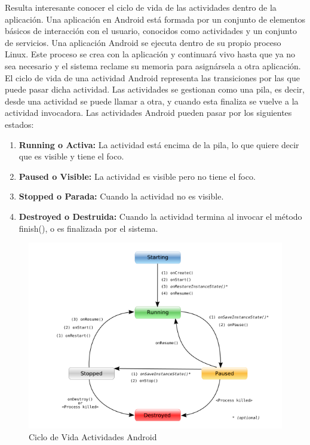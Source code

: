 \documentclass[a4paper,11pt]{book}
\begin{document}
Resulta interesante conocer el ciclo de vida\cite{col} de las actividades dentro de la aplicación. Una aplicación en Android está formada por un conjunto de elementos básicos de interacción con el usuario, conocidos como actividades y un conjunto de servicios. Una aplicación Android se ejecuta dentro de su propio proceso Linux. Este proceso se crea con la aplicación y continuará vivo hasta que ya no sea necesario y el sistema reclame su memoria para asignársela a otra aplicación. El ciclo de vida de una actividad Android representa las transiciones por las que puede pasar dicha actividad. Las actividades se gestionan como una pila, es decir, desde una actividad se puede llamar a otra, y cuando esta finaliza se vuelve a la actividad invocadora. Las actividades Android pueden pasar por los siguientes estados:

\begin{enumerate}
\item \textbf{Running o Activa:} La actividad está encima de la pila, lo que quiere decir que es visible y tiene el foco.
\item \textbf{Paused o Visible:} La actividad es visible pero no tiene el foco. 
\item \textbf{Stopped o Parada:} Cuando la actividad no es visible. 
\item \textbf{Destroyed o Destruida:} Cuando la actividad termina al invocar el método finish(), o es finalizada por el sistema. 
\end{enumerate}

\begin{figure}[H] 
\centering 
\includegraphics[scale=0.6]{imagenes/desarrollo_herramienta/ciclo_android.png}
\caption{ Ciclo de Vida Actividades Android\cite{colD}}
\end{figure}
\end{document}
